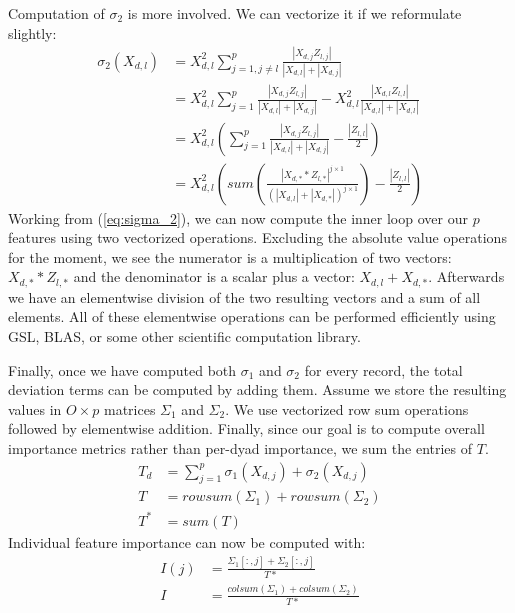 \documentclass[10pt]{journal}
\begin{document}
Computation of $\sigma_2$ is more involved. We can vectorize it if we
reformulate slightly:
%
\begin{align}
    \sigma_2(X_{d,l})
        &= X_{d,l}^2 \sum_{j=1, j \neq l}^p
            \frac{|X_{d,j} Z_{l,j}|}
                 {|X_{d,l}| + |X_{d,j}|}  \\
        &= X_{d,l}^2 \sum_{j=1}^p
            \frac{|X_{d,j} Z_{l,j}|}
                 {|X_{d,l}| + |X_{d,j}|} -
             X_{d,l}^2 \frac{|X_{d,l} Z_{l,l}|}
                            {|X_{d,l}| + |X_{d,l}|}  \\
        &= X_{d,l}^2 \left(
            \sum_{j=1}^p
                \frac{|X_{d,j} Z_{l,j}|}
                     {|X_{d,l}| + |X_{d,j}|} -
            \frac{|Z_{l,l}|}{2}
        \right) \\
        &= X_{d,l}^2 \left(  \label{eq:sigma_2}
            sum \left(
                \frac{|X_{d,*} * Z_{l,*}|^{j \times 1}}
                {(|X_{d,l}| + |X_{d,*}|)^{j \times 1}}
            \right) - \frac{|Z_{l,l}|}{2}
        \right)
\end{align}
%
Working from (\ref{eq:sigma_2}), we can now compute the inner loop over our $p$
features using two vectorized operations. Excluding the absolute value
operations for the moment, we see the numerator is a multiplication of two
vectors: $X_{d,*} * Z_{l, *}$ and the denominator is a scalar plus a vector:
$X_{d,l} + X_{d,*}$. Afterwards we have an elementwise division of the two
resulting vectors and a sum of all elements. All of these elementwise operations
can be performed efficiently using GSL, BLAS, or some other scientific
computation library.

Finally, once we have computed both $\sigma_1$ and $\sigma_2$ for every record,
the total deviation terms can be computed by adding them. Assume we store the
resulting values in $O \times p$ matrices $\Sigma_1$ and $\Sigma_2$. We use
vectorized row sum operations followed by elementwise addition. Finally, since
our goal is to compute overall importance metrics rather than per-dyad
importance, we sum the entries of $T$.
%
\begin{align}
    T_d &= \sum_{j=1}^p \sigma_1(X_{d,j}) + \sigma_2(X_{d,j})  \\[3mm]
    T   &= rowsum(\Sigma_1) + rowsum(\Sigma_2)  \\[3mm]
    T^* &= sum(T)
\end{align}
%
Individual feature importance can now be computed with:
%
\begin{align}
    I(j) &= \frac{\Sigma_1[:, j] + \Sigma_2[:, j]}{T*}  \\[3mm]
    I    &= \frac{colsum(\Sigma_1) + colsum(\Sigma_2)}{T*}
\end{align}
%
\end{document}
